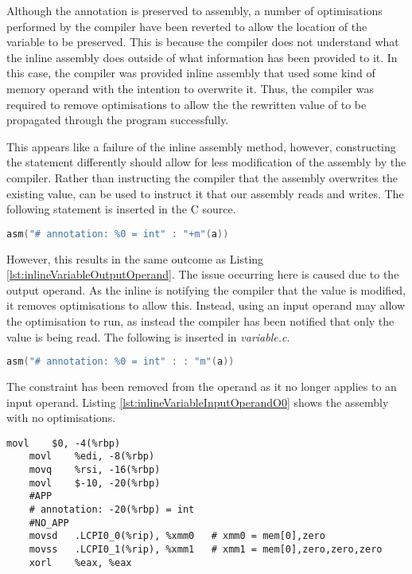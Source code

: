 Although the annotation is preserved to assembly, a number of optimisations performed by the compiler have been reverted to allow the location of the variable  to be preserved. This is because the compiler does not understand what the inline assembly does outside of what information has been provided to it. In this case, the compiler was provided inline assembly that used some kind of memory operand with the intention to overwrite it. Thus, the compiler was required to remove optimisations to allow the the rewritten value of  to be propagated through the program successfully. 

This appears like a failure of the inline assembly method, however, constructing the statement differently should allow for less modification of the assembly by the compiler. Rather than instructing the compiler that the assembly overwrites the existing value,  can be used to instruct it that our assembly reads and writes. The following statement is inserted in the C source.

\begin{lstlisting}[language=C, numbers=none]
asm("# annotation: %0 = int" : "+m"(a))
\end{lstlisting}

However, this results in the same outcome as Listing \ref{lst:inlineVariableOutputOperand}. The issue occurring here is caused due to the output operand. As the inline  is notifying the compiler that the value is modified, it removes optimisations to allow this. Instead, using an input operand may allow the optimisation to run, as instead the compiler has been notified that only the value is being read. The following  is inserted in \textit{variable.c}.

\begin{lstlisting}[language=C, numbers=none]
asm("# annotation: %0 = int" : : "m"(a))
\end{lstlisting}

The  constraint has been removed from the operand as it no longer applies to an input operand. Listing \ref{lst:inlineVariableInputOperandO0} shows the assembly with no optimisations.

\begin{lstlisting}[firstnumber=23, caption=variable-O0.s, label=lst:inlineVariableInputOperandO0]
	movl	$0, -4(%rbp)
	movl	%edi, -8(%rbp)
	movq	%rsi, -16(%rbp)
	movl	$-10, -20(%rbp)
	#APP
	# annotation: -20(%rbp) = int
	#NO_APP
	movsd	.LCPI0_0(%rip), %xmm0   # xmm0 = mem[0],zero
	movss	.LCPI0_1(%rip), %xmm1   # xmm1 = mem[0],zero,zero,zero
	xorl	%eax, %eax
\end{lstlisting}

